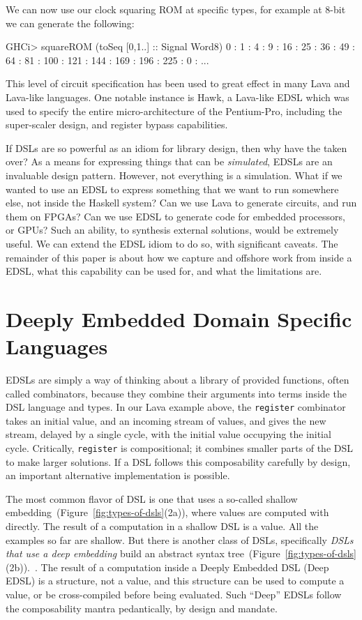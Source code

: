 \documentclass[11pt]{article}
\begin{document}
We can now use our clock squaring ROM at specific types,
for example at 8-bit we can generate the following:
\begin{Code}
GHCi> squareROM (toSeq [0,1..] :: Signal Word8)        
0 : 1 : 4 : 9 : 16 : 25 : 36 : 49 : 64 : 81 : 100 : 121 : 144 : 169 : 196 : 225 : 0 : ...
\end{Code}

This level of circuit specification has been used to great
effect in many Lava and Lava-like languages. One notable
instance is Hawk, a Lava-like EDSL which was used to specify
the entire micro-architecture of the Pentium-Pro, including the
super-scaler design, and register bypass capabilities.

If DSLs are so powerful as an idiom for library design, then why have the taken over?
As a means for expressing things that can be {\em simulated\/}, EDSLs are an invaluable
design pattern. 
However, not everything is a simulation. What if we wanted to use an EDSL to express
something that we want to run somewhere else, not inside the Haskell system?
Can we use Lava to generate circuits, and run them on FPGAs? Can we use EDSL
to generate code for embedded processors, or GPUs? Such an ability, to 
synthesis external solutions, would be extremely useful. We can extend
the EDSL idiom to do so, with significant caveats. The remainder of this
paper is about how we capture and offshore work from inside a EDSL, what
this capability can be used for, and what the limitations are.

\section{Deeply Embedded Domain Specific Languages}

EDSLs are simply a way of thinking about a library
of provided functions, often called combinators, because they combine
their arguments into terms inside the DSL language and types. In our
Lava example above, the \verb|register| combinator takes an initial
value, and an incoming stream of values, and gives the new stream,
delayed by a single cycle, with the initial value occupying the initial
cycle. Critically, \verb|register| is compositional; it combines
smaller parts of the DSL to make larger solutions. If a DSL
follows this composability carefully by design, an important alternative implementation
is possible.

The most common flavor of DSL is one  that uses a so-called shallow embedding~(Figure~\ref{fig:types-of-dsls}(2a)), where values are computed with directly.
The result of a computation in a shallow DSL is a value. All the examples so far are shallow.
But there is another class of DSLs, 
specifically {\em DSLs that use a deep embedding\/} build an abstract syntax tree~(Figure~\ref{fig:types-of-dsls}(2b)).~\cite{Elliott:03:CompileDSEL-JFP}.
The result of a computation inside a Deeply Embedded DSL (Deep EDSL)
is a structure, not a value, and this structure can be used to compute a value,
or be cross-compiled before being evaluated. Such ``Deep'' EDSLs
follow the composability mantra pedantically, by design and mandate.
\end{document}
